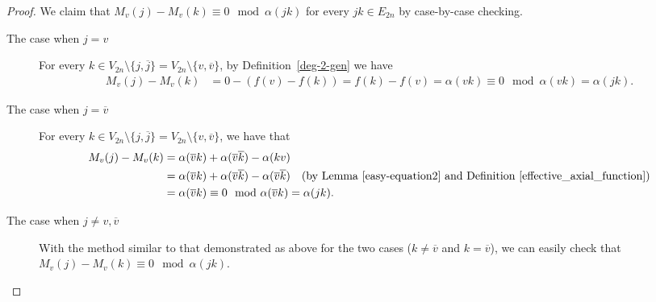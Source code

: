 \documentclass[12pt]{amsart}
\theoremstyle{remark}
\numberwithin{equation}{section}
\begin{document}
\begin{proof}
We claim that $M_{v}(j)-M_{v}(k)\equiv 0 \mod \alpha(jk)$ for every $jk\in E_{2n}$ by case-by-case checking. 
\begin{description}
\item[The case when $j=v$]
For every $k\in V_{2n}\setminus \{j,\overline{j}\}= V_{2n}\setminus \{v,\overline{v}\}$, 
by Definition~\ref{deg-2-gen} we have 
\begin{align*}
M_{v}(j)-M_{v}(k)&=0-(f(v)-f(k))=f(k)-f(v)=\alpha(vk)\equiv 0 \mod \alpha(vk)=\alpha(jk).
\end{align*}
\item[The case when $j=\overline{v}$]
For every $k\in V_{2n}\setminus \{j,\overline{j}\}= V_{2n}\setminus \{v,\overline{v}\}$, 
we have that
\begin{align*}
M_{v}(j)-M_{v}(k)
&=\alpha(\overline{v}k)+\alpha(\overline{v}\overline{k})-\alpha(kv) \\
&=\alpha(\overline{v}k)+\alpha(\overline{v}\overline{k})-\alpha(\overline{v}\overline{k}) \quad ({\rm by\ Lemma~\ref{easy-equation2}\ and\ Definition~\ref{effective_axial_function}}) \\
&=\alpha(\overline{v}k)\equiv 0 \mod \alpha(\overline{v}k)=\alpha(jk).
\end{align*}
\item[The case when $j\not=v, \overline{v}$]
With the method similar to that demonstrated as above for the two cases ($k\not=\overline{v}$ and $k=\overline{v}$), we can easily check that $M_{v}(j)-M_{v}(k)\equiv 0\mod \alpha(jk)$.

\end{description}
\end{proof}
\end{document}
